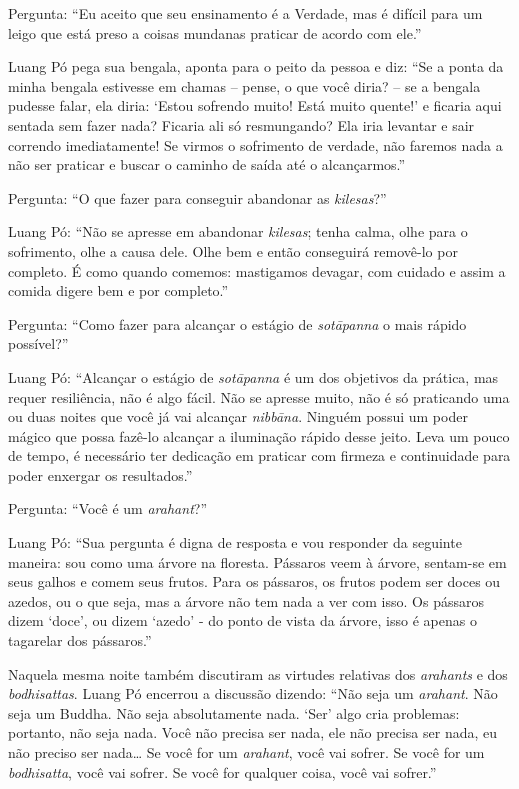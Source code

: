 Pergunta: ``Eu aceito que seu ensinamento é a Verdade, mas é difícil
para um leigo que está preso a coisas mundanas praticar de acordo com
ele.''

Luang Pó pega sua bengala, aponta para o peito da pessoa e diz: ``Se a
ponta da minha bengala estivesse em chamas -- pense, o que você diria?
-- se a bengala pudesse falar, ela diria: `Estou sofrendo muito! Está
muito quente!' e ficaria aqui sentada sem fazer nada? Ficaria ali só
resmungando? Ela iria levantar e sair correndo imediatamente! Se virmos
o sofrimento de verdade, não faremos nada a não ser praticar e buscar o
caminho de saída até o alcançarmos.''

Pergunta: ``O que fazer para conseguir abandonar as \emph{kilesas}?''

Luang Pó: ``Não se apresse em abandonar \emph{kilesas}; tenha calma,
olhe para o sofrimento, olhe a causa dele. Olhe bem e então conseguirá
removê-lo por completo. É como quando comemos: mastigamos devagar, com
cuidado e assim a comida digere bem e por completo.''

Pergunta: ``Como fazer para alcançar o estágio de \emph{sotāpanna} o
mais rápido possível?''

Luang Pó: ``Alcançar o estágio de \emph{sotāpanna} é um dos objetivos da
prática, mas requer resiliência, não é algo fácil. Não se apresse muito,
não é só praticando uma ou duas noites que você já vai alcançar
\emph{nibbāna}. Ninguém possui um poder mágico que possa fazê-lo
alcançar a iluminação rápido desse jeito. Leva um pouco de tempo, é
necessário ter dedicação em praticar com firmeza e continuidade para
poder enxergar os resultados.''

Pergunta: ``Você é um \emph{arahant}?''

Luang Pó: ``Sua pergunta é digna de resposta e vou responder da seguinte
maneira: sou como uma árvore na floresta. Pássaros veem à árvore,
sentam-se em seus galhos e comem seus frutos. Para os pássaros, os
frutos podem ser doces ou azedos, ou o que seja, mas a árvore não tem
nada a ver com isso. Os pássaros dizem `doce', ou dizem `azedo' - do
ponto de vista da árvore, isso é apenas o tagarelar dos pássaros.''

Naquela mesma noite também discutiram as virtudes relativas dos
\emph{arahants} e dos \emph{bodhisattas}. Luang Pó encerrou a discussão
dizendo: ``Não seja um \emph{arahant}. Não seja um Buddha. Não seja
absolutamente nada. `Ser' algo cria problemas: portanto, não seja nada.
Você não precisa ser nada, ele não precisa ser nada, eu não preciso ser
nada\ldots{} Se você for um \emph{arahant}, você vai sofrer. Se você for
um \emph{bodhisatta}, você vai sofrer. Se você for qualquer coisa, você
vai sofrer.''

